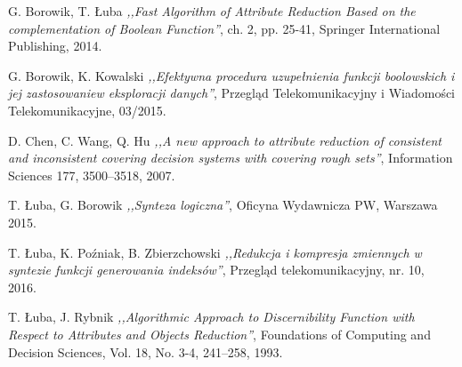 
\begin{thebibliography}{99}


 G. Borowik, T. Łuba \emph{,,Fast Algorithm of Attribute Reduction Based on the complementation of Boolean Function''}, ch. 2, pp. 25-41, Springer International Publishing, 2014.

 G. Borowik, K. Kowalski \emph{,,Efektywna procedura uzupełnienia funkcji boolowskich i jej zastosowaniew eksploracji danych''}, Przegląd Telekomunikacyjny i Wiadomości Telekomunikacyjne, 03/2015.

 D. Chen, C. Wang, Q. Hu \emph{,,A new approach to attribute reduction of consistent and inconsistent covering decision systems with covering rough sets''}, Information Sciences 177, 3500–3518, 2007.

 T. Łuba, G. Borowik \emph{,,Synteza logiczna''}, Oficyna Wydawnicza PW, Warszawa 2015.

 T. Łuba, K. Poźniak, B. Zbierzchowski \emph{,,Redukcja i kompresja zmiennych w syntezie funkcji generowania indeksów''}, Przegląd telekomunikacyjny, nr. 10, 2016.

 T. Łuba, J. Rybnik \emph{,,Algorithmic Approach to Discernibility Function with Respect to Attributes and Objects Reduction''}, Foundations of Computing and Decision Sciences, Vol. 18, No. 3-4, 241–258, 1993.


\end{thebibliography}
